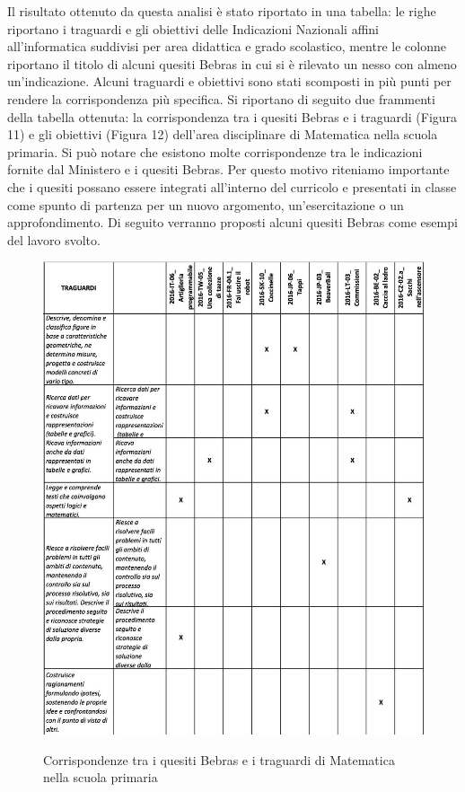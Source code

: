 \documentclass[12pt]{report}
\begin{document}
Il risultato ottenuto da questa analisi è stato riportato in una tabella: le righe riportano i traguardi e gli obiettivi delle Indicazioni Nazionali affini all'informatica suddivisi per area didattica e grado scolastico, mentre le colonne riportano il titolo di alcuni quesiti Bebras in cui si è rilevato un nesso con almeno un'indicazione.
Alcuni traguardi e obiettivi sono stati scomposti in più punti per rendere la corrispondenza più specifica.
Si riportano di seguito due frammenti della tabella ottenuta: la corrispondenza tra i quesiti Bebras e i traguardi (Figura 11) e gli obiettivi (Figura 12) dell'area disciplinare di Matematica nella scuola primaria.
Si può notare che esistono molte corrispondenze tra le indicazioni fornite dal Ministero e i quesiti Bebras. Per questo motivo riteniamo importante che i quesiti possano essere integrati all'interno del curricolo e presentati in classe come spunto di partenza per un nuovo argomento, un'esercitazione o un approfondimento.
Di seguito verranno proposti alcuni quesiti Bebras come esempi del lavoro svolto.

\begin{figure}[H]
	\centering
	\includegraphics[width=15.0cm]{./immagini/02_Cap2/TabellaMatchIndicazioniMate} \label{indicazioniMatematica}
	\caption{Corrispondenze tra i quesiti Bebras e i traguardi di Matematica nella scuola primaria}
\end{figure}
\end{document}
